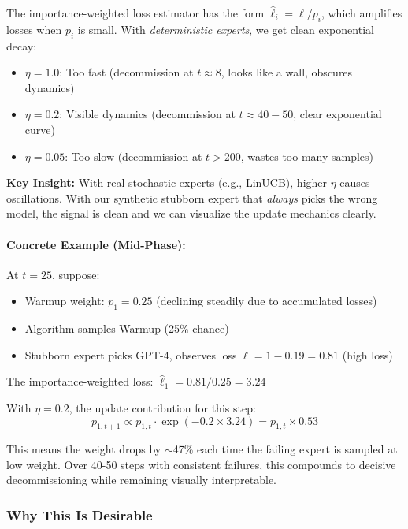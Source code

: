 The importance-weighted loss estimator has the form $\hat{\ell}_i = \ell / p_i$, which amplifies losses when $p_i$ is small. With \emph{deterministic experts}, we get clean exponential decay:

\begin{itemize}
    \item $\eta=1.0$: Too fast (decommission at $t \approx 8$, looks like a wall, obscures dynamics)
    \item $\eta=0.2$: Visible dynamics (decommission at $t \approx 40-50$, clear exponential curve)
    \item $\eta=0.05$: Too slow (decommission at $t > 200$, wastes too many samples)
\end{itemize}

\textbf{Key Insight:} With real stochastic experts (e.g., LinUCB), higher $\eta$ causes oscillations. With our synthetic stubborn expert that \emph{always} picks the wrong model, the signal is clean and we can visualize the update mechanics clearly.

\paragraph{Concrete Example (Mid-Phase):}

At $t=25$, suppose:
\begin{itemize}
    \item Warmup weight: $p_1 = 0.25$ (declining steadily due to accumulated losses)
    \item Algorithm samples Warmup (25\% chance)
    \item Stubborn expert picks GPT-4, observes loss $\ell = 1 - 0.19 = 0.81$ (high loss)
\end{itemize}

The importance-weighted loss: $\hat{\ell}_1 = 0.81 / 0.25 = 3.24$

With $\eta=0.2$, the update contribution for this step:
\begin{equation}
p_{1,t+1} \propto p_{1,t} \cdot \exp(-0.2 \times 3.24) = p_{1,t} \times 0.53
\end{equation}

This means the weight drops by $\sim$47\% each time the failing expert is sampled at low weight. Over 40-50 steps with consistent failures, this compounds to decisive decommissioning while remaining visually interpretable.

\subsubsection{Why This Is Desirable}

